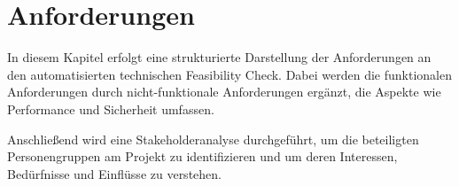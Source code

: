 \chapter{Anforderungen}\label{Chap:Anforderungen}

In diesem Kapitel erfolgt eine strukturierte Darstellung der Anforderungen an den automatisierten technischen Feasibility Check. Dabei werden die funktionalen Anforderungen durch nicht-funktionale Anforderungen ergänzt, die Aspekte wie Performance und Sicherheit umfassen.

Anschließend wird eine Stakeholderanalyse durchgeführt, um die beteiligten Personengruppen am Projekt zu identifizieren und um deren Interessen, Bedürfnisse und Einflüsse zu verstehen. 









